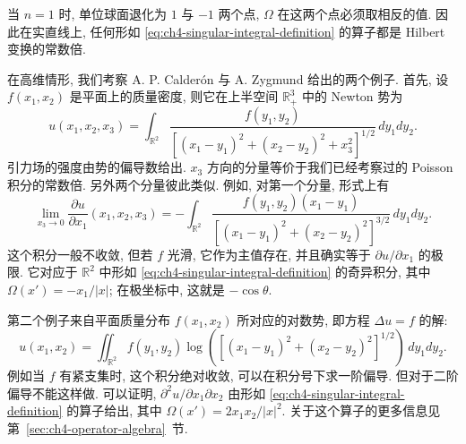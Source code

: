 \hypertarget{chapter-04-page-082}{}
当 $n=1$ 时, 单位球面退化为 $1$ 与 $-1$ 两个点, $\Omega$ 在这两个点必须取相反的值. 因此在实直线上, 任何形如 \eqref{eq:ch4-singular-integral-definition} 的算子都是 Hilbert 变换的常数倍.

在高维情形, 我们考察 A. P. Calderón 与 A. Zygmund 给出的两个例子. 首先, 设 $f(x_1,x_2)$ 是平面上的质量密度, 则它在上半空间 $\mathbb R_+^3$ 中的 Newton 势为
\[
 u(x_1,x_2,x_3)=\int_{\mathbb R^2}
 \frac{f(y_1,y_2)}{[(x_1-y_1)^2+(x_2-y_2)^2+x_3^2]^{1/2}}\,dy_1dy_2.
\]
引力场的强度由势的偏导数给出. $x_3$ 方向的分量等价于我们已经考察过的 Poisson 积分的常数倍. 另外两个分量彼此类似. 例如, 对第一个分量, 形式上有
\[
 \lim_{x_3\to0}\frac{\partial u}{\partial x_1}(x_1,x_2,x_3)
 =-\int_{\mathbb R^2}\frac{f(y_1,y_2)(x_1-y_1)}
 {[(x_1-y_1)^2+(x_2-y_2)^2]^{3/2}}\,dy_1dy_2.
\]
这个积分一般不收敛, 但若 $f$ 光滑, 它作为主值存在, 并且确实等于 $\partial u/\partial x_1$ 的极限. 它对应于 $\mathbb R^2$ 中形如 \eqref{eq:ch4-singular-integral-definition} 的奇异积分, 其中 $\Omega(x')=-x_1/|x|$; 在极坐标中, 这就是 $-\cos\theta$.

第二个例子来自平面质量分布 $f(x_1,x_2)$ 所对应的对数势, 即方程 $\Delta u=f$ 的解:
\[
 u(x_1,x_2)=\iint_{\mathbb R^2}f(y_1,y_2)
 \log([(x_1-y_1)^2+(x_2-y_2)^2]^{1/2})\,dy_1dy_2.
\]
例如当 $f$ 有紧支集时, 这个积分绝对收敛, 可以在积分号下求一阶偏导. 但对于二阶偏导不能这样做. 可以证明, $\partial^2u/\partial x_1\partial x_2$ 由形如 \eqref{eq:ch4-singular-integral-definition} 的算子给出, 其中 $\Omega(x')=2x_1x_2/|x|^2$. 关于这个算子的更多信息见第~\ref{sec:ch4-operator-algebra}~节.
